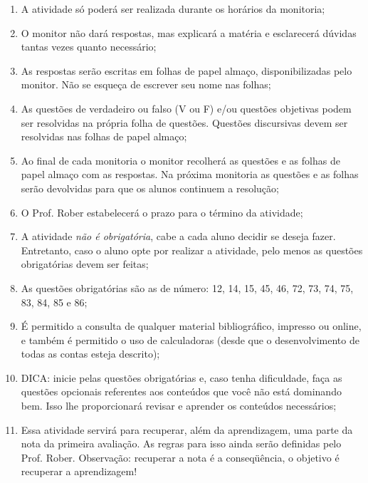 \documentclass[pdftex, brazil, 12pt, oneside, addpoints]{exam}
\begin{document}
\begin{enumerate}
  \item A atividade só poderá ser realizada durante os horários da
        monitoria;
  \item O monitor não dará respostas, mas explicará a matéria e
        esclarecerá dúvidas tantas vezes quanto necessário;
  \item As respostas serão escritas em folhas de papel almaço,
        disponibilizadas pelo monitor. Não se esqueça de escrever seu
        nome nas folhas;
  \item As questões de verdadeiro ou falso (V ou F) e/ou questões
        objetivas podem ser resolvidas na própria folha de
        questões. Questões discursivas devem ser resolvidas nas folhas de
        papel almaço;
  \item Ao final de cada monitoria o monitor recolherá as questões e
        as folhas de papel almaço com as respostas. Na próxima
        monitoria as questões e as folhas serão devolvidas para que os
        alunos continuem a resolução;
  \item O Prof. Rober estabelecerá o prazo para o término da
        atividade;
  \item A atividade \emph{não é obrigatória}, cabe a cada aluno
        decidir se deseja fazer. Entretanto, caso o aluno opte por
        realizar a atividade, pelo menos as questões obrigatórias
        devem ser feitas;
  \item As questões obrigatórias são as de número: 12, 14, 15, 45, 46,
        72, 73, 74, 75, 83, 84, 85 e 86;
  \item É permitido a consulta de qualquer material bibliográfico,
        impresso ou online, e também é permitido o uso de calculadoras
        (desde que o desenvolvimento de todas as contas esteja
        descrito);
  \item DICA: inicie pelas questões obrigatórias e, caso tenha
        dificuldade, faça as questões opcionais referentes aos
        conteúdos que você não está dominando bem. Isso lhe
        proporcionará revisar e aprender os conteúdos necessários;
  \item Essa atividade servirá para recuperar, além da aprendizagem,
        uma parte da nota da primeira avaliação. As regras para isso
        ainda serão definidas pelo Prof. Rober. Observação: recuperar
        a nota é a conseqüência, o objetivo é recuperar a aprendizagem!
\end{enumerate}
\end{document}

